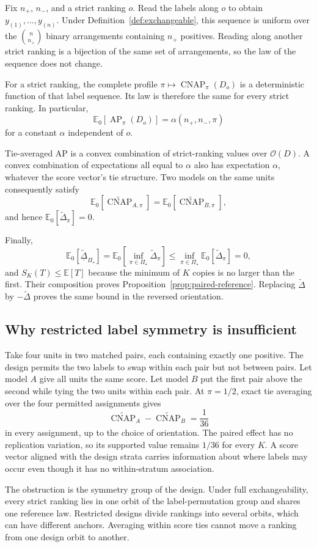 \documentclass[11pt]{article}
\newcommand{\AP}{\operatorname{AP}}
\newcommand{\CNAP}{\operatorname{CNAP}}
\newcommand{\PSet}{\Pi_\star}
\newcommand{\E}{\mathbb{E}}
\newcommand{\CNAPta}{\widetilde{\CNAP}}
\newcommand{\Dta}{\widetilde{\Delta}}
\newcommand{\RobDta}{\underline{\widetilde{\Delta}}_{\PSet}}
\theoremstyle{remark}
\begin{document}
Fix $n_+$, $n_-$, and a strict ranking $o$. Read the labels along $o$ to obtain $y_{(1)},\ldots,y_{(n)}$. Under Definition~\ref{def:exchangeable}, this sequence is uniform over the $\binom n{n_+}$ binary arrangements containing $n_+$ positives. Reading along another strict ranking is a bijection of the same set of arrangements, so the law of the sequence does not change.

For a strict ranking, the complete profile $\pi\mapsto\CNAP_\pi(D_o)$ is a deterministic function of that label sequence. Its law is therefore the same for every strict ranking. In particular,
\[
\E_0[\AP_\pi(D_o)]
=
\alpha(n_+,n_-,\pi)
\]
for a constant $\alpha$ independent of $o$.

Tie-averaged AP is a convex combination of strict-ranking values over $\mathcal O(D)$. A convex combination of expectations all equal to $\alpha$ also has expectation $\alpha$, whatever the score vector's tie structure. Two models on the same units consequently satisfy
\[
\E_0[\CNAPta_{A,\pi}]
=
\E_0[\CNAPta_{B,\pi}],
\]
and hence $\E_0[\Dta_\pi]=0$.

Finally,
\[
\E_0[\RobDta]
=
\E_0\left[\inf_{\pi\in\PSet}\Dta_\pi\right]
\leq
\inf_{\pi\in\PSet}\E_0[\Dta_\pi]
=0,
\]
and $S_K(T)\leq\E[T]$ because the minimum of $K$ copies is no larger than the first. Their composition proves Proposition~\ref{prop:paired-reference}. Replacing $\Dta$ by $-\Dta$ proves the same bound in the reversed orientation.

\subsection{Why restricted label symmetry is insufficient}

Take four units in two matched pairs, each containing exactly one positive. The design permits the two labels to swap within each pair but not between pairs. Let model $A$ give all units the same score. Let model $B$ put the first pair above the second while tying the two units within each pair. At $\pi=1/2$, exact tie averaging over the four permitted assignments gives
\[
\CNAPta_A-\CNAPta_B
=
\frac1{36}
\]
in every assignment, up to the choice of orientation. The paired effect has no replication variation, so its supported value remains $1/36$ for every $K$. A score vector aligned with the design strata carries information about where labels may occur even though it has no within-stratum association.

The obstruction is the symmetry group of the design. Under full exchangeability, every strict ranking lies in one orbit of the label-permutation group and shares one reference law. Restricted designs divide rankings into several orbits, which can have different anchors. Averaging within score ties cannot move a ranking from one design orbit to another.
\end{document}
